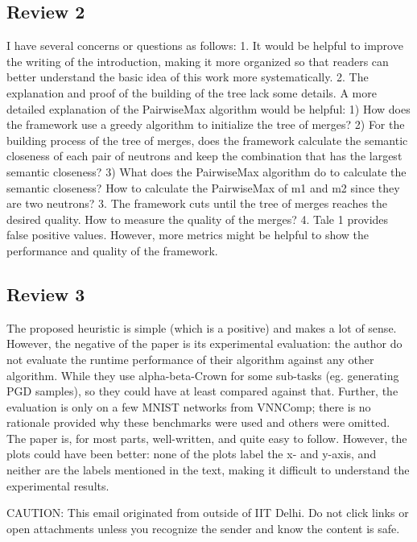   \subsection{Review 2}
  
 I have several concerns or questions as follows:
  1. It would be helpful to improve the writing of the introduction,  making it
     more organized so that readers can better understand the  basic idea of
     this work more systematically.
  2. The explanation and proof of the building of the tree lack some  details. A
     more detailed explanation of the PairwiseMax algorithm  would be helpful:
 1) How does the framework use a greedy algorithm to initialize the  tree of
    merges?  2) For the building process of the tree of merges, does the
    framework  calculate the semantic closeness of each pair of neutrons and
    keep the  combination that has the largest semantic closeness?
 3) What does the PairwiseMax algorithm do to calculate the semantic  closeness?
    How to calculate the PairwiseMax of m1 and m2 since they  are two neutrons?
  3. The framework cuts until the tree of merges reaches the desired  quality.
     How to measure the quality of the merges?
  4. Tale 1 provides false positive values. However, more metrics might  be
     helpful to show the performance and quality of the framework.

\subsection{Review 3}
     
 The proposed heuristic is simple (which is a positive) and makes a lot  of
 sense. However, the negative of the paper is its experimental  evaluation: the
 author do not evaluate the runtime performance of  their algorithm against any
 other algorithm. While they use  alpha-beta-Crown for some sub-tasks (eg.
 generating PGD samples), so  they could have at least compared against that.
 Further, the  evaluation is only on a few MNIST networks from VNNComp; there is
 no  rationale provided why these benchmarks were used and others were  omitted.
 The paper is, for most parts, well-written, and quite easy to follow.  However,
 the plots could have been better: none of the plots label the  x- and y-axis,
 and neither are the labels mentioned in the text,  making it difficult to
 understand the experimental results.

CAUTION: This email originated from outside of IIT Delhi. Do not click links or
open attachments unless you recognize the sender and know the content is safe.
